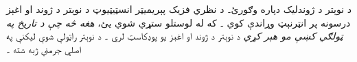 \documentclass[../../../include/open-logic-section]{subfiles}
\begin{document}
\begin{reading}
د نوېتر د ژوندليک دپاره \citet{Dick1981}
وګورئ۔ د نظري فزيک پېريميټر انسټيټيوټ
د نوېتر د ژوند او اغېز درسونه پر
انټرنېټ وړاندې کوي \citep{Perimeter2015}۔
که له لوستلو ستړي شوي يئ، \emph{هغه څه
چې د تاريخ په ټولګي کښې مو هېر کړي}
د نوېتر د ژوند او اغېز يو پوډکاسټ لري
\citep{Frey2015}۔ د نوېتر راټولې شوې
ليکنې په اصلي جرمني ژبه شته
\citep{Noether1983}۔
\end{reading}
\end{document}
